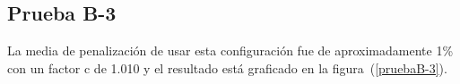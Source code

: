 
\subsection{Prueba B-3}

La media de penalización de usar esta configuración fue de aproximadamente 1\% con un factor c de 1.010 y el resultado está graficado en la figura~(\ref{pruebaB-3}).




